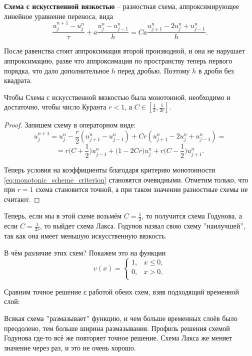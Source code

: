 \documentclass{article}
\begin{document}
\begin{define}\label{eq:god_lax_scheme}
	\textbf{Схема с искусственной вязкостью} -- разностная схема,
	аппроксимирующее линейное уравнение переноса, вида
	\[\frac{u_j^{n+1}-u_j^n}{\tau}+a\frac{u_j^n-u_{j-1}^n}{h}=
	Ca\frac{u_{j+1}^n-2u_j^n+u_{j-1}^n}{h}.\]
\end{define}

После равенства стоит аппроксимация второй производной, и она не нарушает
аппроксимацию, разве что аппроксимация по пространству теперь первого порядка,
что дало дополнительное $h$ перед дробью. Поэтому $h$ в дроби без квадрата.

\begin{lemma}
	Чтобы Схема с искусственной вязкостью была монотонной, необходимо
	и достаточно, чтобы число Куранта $r<1$, а
	$C\in[\frac{1}{2},\frac{1}{2r}]$.
\end{lemma}

\begin{proof}
	Запишем схему в операторном виде:
	\[u_j^{n+1}=u_j^n-\frac{r}{2}(u_{j+1}^n-u_{j-1}^n)+Cr(u_{j+1}^n-2u_j^n+
	u_{j-1}^n)=\]
	\[=r\Big(C+\frac{1}{2}\Big)u_{j-1}^n+\Big(1-2Cr\Big)u_j^n+r\Big(C-
	\frac{1}{2}\Big)u_{j+1}^n.\]

	Теперь условия на коэффициенты благодаря критерию монотонности
	\eqref{eq:monotonic_scheme_criterion} становятся очевидными.
	Отметим только, что при $r=1$ схема становится точной, а при таком
	значении разностные схемы не считают.
\end{proof}

Теперь, если мы в этой схеме возьмём $C=\frac{1}{2}$, то получится схема
Годунова, а если $C=\frac{1}{2r}$, то выйдет схема Лакса. Годунов назвал свою
схему ''наилучшей'', так как она имеет меньшую искусственную вязкость.

В чём различие этих схем? Покажем это на функции
\[v(x)=
	\begin{cases}
		1, & x\le 0, \\
		0, & x>0. \\
	\end{cases}
\]

Сравним точное решение с работой обеих схем, взяв подходящий временной слой:



Всякая схема ''размазывает'' функцию, и чем больше временных слоёв было
преодолено, тем больше ширина размазывания. Профиль решения схемой Годунова
где-то всё же повторяет точное решение. Схема Лакса же меняет значение через
раз, и это не очень хорошо.
\end{document}
